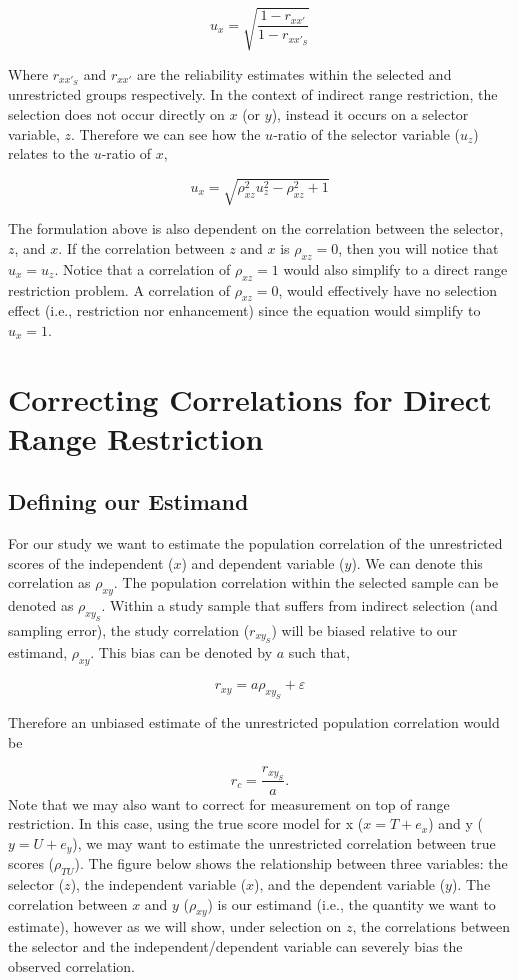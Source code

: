\documentclass[
  letterpaper,
  DIV=11,
  numbers=noendperiod]{scrreprt}
\begin{document}
\[
u_x = \sqrt{\frac{1-r_{xx'}}{1-r_{xx'_S}}}
\]

Where \(r_{xx'_S}\) and \(r_{xx'}\) are the reliability estimates within
the selected and unrestricted groups respectively. In the context of
indirect range restriction, the selection does not occur directly on
\(x\) (or \(y\)), instead it occurs on a selector variable, \(z\).
Therefore we can see how the \(u\)-ratio of the selector variable
(\(u_z\)) relates to the \(u\)-ratio of \(x\),

\[
u_x = \sqrt{\rho_{xz}^2u_z^2 -\rho_{xz}^2 + 1 }
\]

The formulation above is also dependent on the correlation between the
selector, \(z\), and \(x\). If the correlation between \(z\) and \(x\)
is \(\rho_{xz}=0\), then you will notice that \(u_x=u_z\). Notice that a
correlation of \(\rho_{xz}=1\) would also simplify to a direct range
restriction problem. A correlation of \(\rho_{xz}=0\), would effectively
have no selection effect (i.e., restriction nor enhancement) since the
equation would simplify to \(u_x=1\).

\hypertarget{correcting-correlations-for-direct-range-restriction-1}{%
\section{Correcting Correlations for Direct Range
Restriction}\label{correcting-correlations-for-direct-range-restriction-1}}

\hypertarget{defining-our-estimand-8}{%
\subsection{Defining our Estimand}\label{defining-our-estimand-8}}

For our study we want to estimate the population correlation of the
unrestricted scores of the independent (\(x\)) and dependent variable
(\(y\)). We can denote this correlation as \(\rho_{xy}\). The population
correlation within the selected sample can be denoted as
\(\rho_{xy_S}\). Within a study sample that suffers from indirect
selection (and sampling error), the study correlation (\(r_{xy_S}\))
will be biased relative to our estimand, \(\rho_{xy}\). This bias can be
denoted by \(a\) such that,

\[
r_{xy} = a \rho_{xy_S} + \varepsilon  
\]

Therefore an unbiased estimate of the unrestricted population
correlation would be

\[
r_c = \frac{ r_{xy_S} }{ a}.
\] Note that we may also want to correct for measurement on top of range
restriction. In this case, using the true score model for x
(\(x=T+e_x\)) and y (\(y = U+e_y\)), we may want to estimate the
unrestricted correlation between true scores (\(\rho_{TU}\)). The figure
below shows the relationship between three variables: the selector
(\(z\)), the independent variable (\(x\)), and the dependent variable
(\(y\)). The correlation between \(x\) and \(y\) (\(\rho_{xy}\)) is our
estimand (i.e., the quantity we want to estimate), however as we will
show, under selection on \(z\), the correlations between the selector
and the independent/dependent variable can severely bias the observed
correlation.
\end{document}
